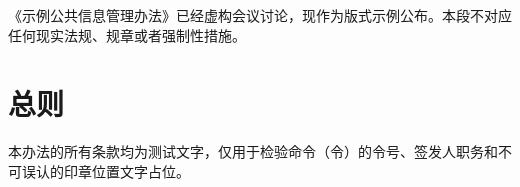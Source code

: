 \documentclass{sysuredhead}
\begin{document}
\RedHeadMakeHead

《示例公共信息管理办法》已经虚构会议讨论，现作为版式示例公布。本段不对应任何现实法规、规章或者强制性措施。

\section{总则}

本办法的所有条款均为测试文字，仅用于检验命令（令）的令号、签发人职务和不可误认的印章位置文字占位。

\RedHeadSealPlaceholder
\RedHeadMakeClosing
\end{document}
